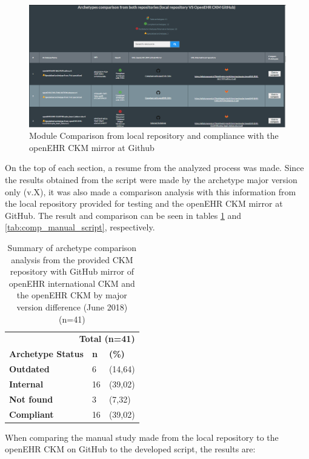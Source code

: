 \documentclass[mim_thesis.tex]{subfiles}
\begin{document}
\begin{figure}[H]
	\centering
    \includegraphics[width=1\textwidth]{img/arch_comparison.PNG}
	\caption{Module Comparison from local repository and compliance with the openEHR CKM mirror at Github}
	\label{fig:arch_comparison}
\end{figure}

On the top of each section, a resume from the analyzed process was made. Since the results obtained from the script were made by the archetype major version only (v.X), it was also made a comparison analysis with this information from the local repository provided for testing and the openEHR CKM mirror at GitHub. The result and comparison can be seen in tables \ref{tab:repos_comp_mv} and \ref{tab:comp_manual_script}, respectively.

\begin{table}[H]
	\centering
	\caption{Summary of archetype comparison analysis from the provided CKM repository with GitHub mirror of openEHR international CKM and the openEHR CKM by major version difference (June 2018) (n=41)}
	\label{tab:repos_comp_mv}
	\begin{tabular}{lll}
		\toprule[2pt]
		\multicolumn{3}{r}{\textbf{ Total (n=41) }} \\
		\cmidrule(r){2-3}
		\textbf{Archetype Status}   & \textbf{n} & \textbf{(\%)} \\
		\midrule[2pt]
		\textbf{Outdated } & 6 & (14,64) \\
		\midrule
		\textbf{Internal } & 16 & (39,02) \\
		\midrule
		\textbf{Not found } & 3 & (7,32) \\
        \midrule
		\textbf{Compliant } & 16 & (39,02) \\
		\bottomrule[2pt]
	\end{tabular}
\end{table}

When comparing the manual study made from the local repository to the openEHR CKM on GitHub to the developed script, the results are:
\end{document}
